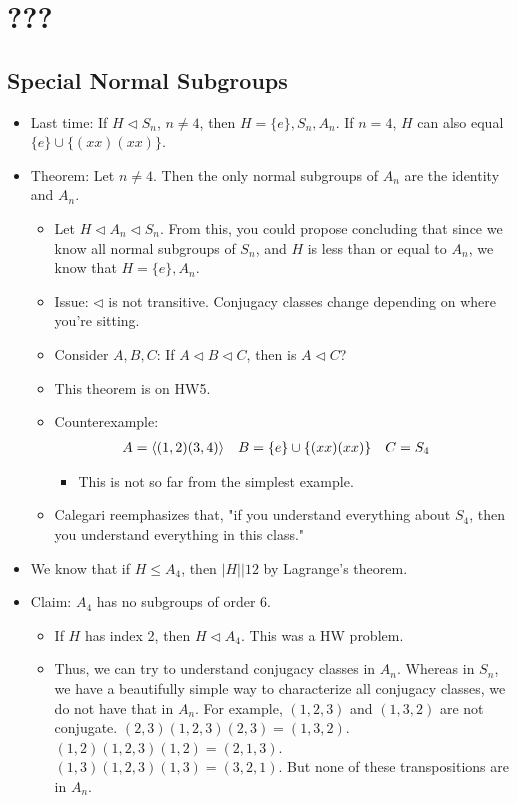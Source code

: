 \documentclass[../notes.tex]{subfiles}
\begin{document}
\chapter{???}
\section{Special Normal Subgroups}
\begin{itemize}
    \item {}Last time: If $H\triangleleft S_n$, $n\neq 4$, then $H=\{e\},S_n,A_n$. If $n=4$, $H$ can also equal $\{e\}\cup\{(xx)(xx)\}$.
    \item Theorem: Let $n\neq 4$. Then the only normal subgroups of $A_n$ are the identity and $A_n$.
    \begin{itemize}
        \item Let $H\triangleleft A_n\triangleleft S_n$. From this, you could propose concluding that since we know all normal subgroups of $S_n$, and $H$ is less than or equal to $A_n$, we know that $H=\{e\},A_n$.
        \item Issue: $\triangleleft$ is not transitive. Conjugacy classes change depending on where you're sitting.
        \item Consider $A,B,C$: If $A\triangleleft B\triangleleft C$, then is $A\triangleleft C$?
        \item This theorem is on HW5.
        \item Counterexample:
        \begin{align*}
            A &= \left\langle{(1,2)(3,4)}\right\rangle&
            B &= \{e\}\cup\{(xx)(xx)\}&
            C &= S_4
        \end{align*}
        \begin{itemize}
            \item This is not so far from the simplest example.
        \end{itemize}
        \item Calegari reemphasizes that, "if you understand everything about $S_4$, then you understand everything in this class."
    \end{itemize}
    \item We know that if $H\leq A_4$, then $|H|\big|12$ by Lagrange's theorem.
    \item Claim: $A_4$ has no subgroups of order 6.
    \begin{itemize}
        \item If $H$ has index 2, then $H\triangleleft A_4$. This was a HW problem.
        \item Thus, we can try to understand conjugacy classes in $A_n$. Whereas in $S_n$, we have a beautifully simple way to characterize all conjugacy classes, we do not have that in $A_n$. For example, $(1,2,3)$ and $(1,3,2)$ are not conjugate. $(2,3)(1,2,3)(2,3)=(1,3,2)$. $(1,2)(1,2,3)(1,2)=(2,1,3)$. $(1,3)(1,2,3)(1,3)=(3,2,1)$. But none of these transpositions are in $A_n$.

\end{itemize}
\end{itemize}
\end{document}
